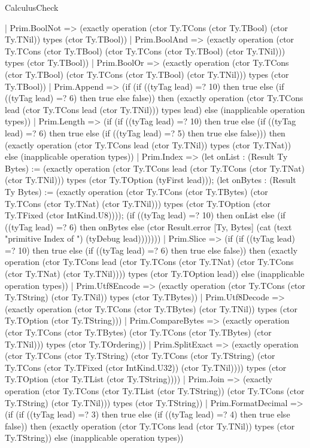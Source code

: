 \begin{lexlean}{CalculusCheck}
\begin{semanticmodule}
{    | Prim.BoolNot => (exactly operation (ctor Ty.TCons (ctor Ty.TBool) (ctor Ty.TNil)) types (ctor Ty.TBool))
    | Prim.BoolAnd => (exactly operation (ctor Ty.TCons (ctor Ty.TBool) (ctor Ty.TCons (ctor Ty.TBool) (ctor Ty.TNil))) types (ctor Ty.TBool))
    | Prim.BoolOr => (exactly operation (ctor Ty.TCons (ctor Ty.TBool) (ctor Ty.TCons (ctor Ty.TBool) (ctor Ty.TNil))) types (ctor Ty.TBool))
    | Prim.Append => (if (if ((tyTag lead) =? 10) then true else (if ((tyTag lead) =? 6) then true else false)) then (exactly operation (ctor Ty.TCons lead (ctor Ty.TCons lead (ctor Ty.TNil))) types lead) else (inapplicable operation types))
    | Prim.Length => (if (if ((tyTag lead) =? 10) then true else (if ((tyTag lead) =? 6) then true else (if ((tyTag lead) =? 5) then true else false))) then (exactly operation (ctor Ty.TCons lead (ctor Ty.TNil)) types (ctor Ty.TNat)) else (inapplicable operation types))
    | Prim.Index => (let onList : (Result Ty Bytes) := (exactly operation (ctor Ty.TCons lead (ctor Ty.TCons (ctor Ty.TNat) (ctor Ty.TNil))) types (ctor Ty.TOption (tyFirst lead))); (let onBytes : (Result Ty Bytes) := (exactly operation (ctor Ty.TCons (ctor Ty.TBytes) (ctor Ty.TCons (ctor Ty.TNat) (ctor Ty.TNil))) types (ctor Ty.TOption (ctor Ty.TFixed (ctor IntKind.U8)))); (if ((tyTag lead) =? 10) then onList else (if ((tyTag lead) =? 6) then onBytes else (ctor Result.error [Ty, Bytes] (cat (text "primitive Index of ") (tyDebug lead)))))))
    | Prim.Slice => (if (if ((tyTag lead) =? 10) then true else (if ((tyTag lead) =? 6) then true else false)) then (exactly operation (ctor Ty.TCons lead (ctor Ty.TCons (ctor Ty.TNat) (ctor Ty.TCons (ctor Ty.TNat) (ctor Ty.TNil)))) types (ctor Ty.TOption lead)) else (inapplicable operation types))
    | Prim.Utf8Encode => (exactly operation (ctor Ty.TCons (ctor Ty.TString) (ctor Ty.TNil)) types (ctor Ty.TBytes))
    | Prim.Utf8Decode => (exactly operation (ctor Ty.TCons (ctor Ty.TBytes) (ctor Ty.TNil)) types (ctor Ty.TOption (ctor Ty.TString)))
    | Prim.CompareBytes => (exactly operation (ctor Ty.TCons (ctor Ty.TBytes) (ctor Ty.TCons (ctor Ty.TBytes) (ctor Ty.TNil))) types (ctor Ty.TOrdering))
    | Prim.SplitExact => (exactly operation (ctor Ty.TCons (ctor Ty.TString) (ctor Ty.TCons (ctor Ty.TString) (ctor Ty.TCons (ctor Ty.TFixed (ctor IntKind.U32)) (ctor Ty.TNil)))) types (ctor Ty.TOption (ctor Ty.TList (ctor Ty.TString))))
    | Prim.Join => (exactly operation (ctor Ty.TCons (ctor Ty.TList (ctor Ty.TString)) (ctor Ty.TCons (ctor Ty.TString) (ctor Ty.TNil))) types (ctor Ty.TString))
    | Prim.FormatDecimal => (if (if ((tyTag lead) =? 3) then true else (if ((tyTag lead) =? 4) then true else false)) then (exactly operation (ctor Ty.TCons lead (ctor Ty.TNil)) types (ctor Ty.TString)) else (inapplicable operation types))
}
\end{semanticmodule}
\end{lexlean}
